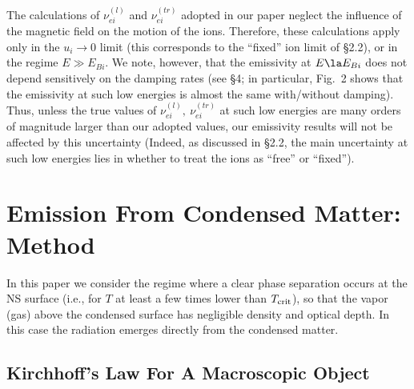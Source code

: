 \documentclass{emulateapj}
\begin{document}
The calculations of $\nu^{(l)}_{ei}$ and $\nu^{(tr)}_{ei}$ 
adopted in our paper neglect the influence of the magnetic field 
on the motion of the ions.  Therefore, these calculations apply only 
in the $u_i\rightarrow 0$ limit (this corresponds to the ``fixed'' 
ion limit of \S 2.2), or in the regime $E\gg E_{Bi}$.
We note, however, that the emissivity at $E\la E_{Bi}$
does not depend sensitively on the damping rates
(see \S 4; in particular, Fig.~2 shows that the emissivity at such 
low energies is almost the same with/without damping). Thus, unless
the true values of $\nu^{(l)}_{ei},~\nu^{(tr)}_{ei}$ at such low energies
are many orders of magnitude larger than our adopted values,
our emissivity results will not be affected by this uncertainty
(Indeed, as discussed in \S 2.2, the main uncertainty at such low energies
lies in whether to treat the ions as ``free'' or ``fixed'').

\section{Emission From Condensed Matter: Method}
\label{sect:Method}

In this paper we consider the regime where a clear phase separation occurs at the NS surface 
(i.e., for $T$ at least a few times lower than $T_{\rm crit}$), so that the vapor (gas) above 
the condensed surface has negligible density and optical depth.  In this case the radiation 
emerges directly from the condensed matter.
\subsection{Kirchhoff's Law For A Macroscopic Object}
\end{document}
